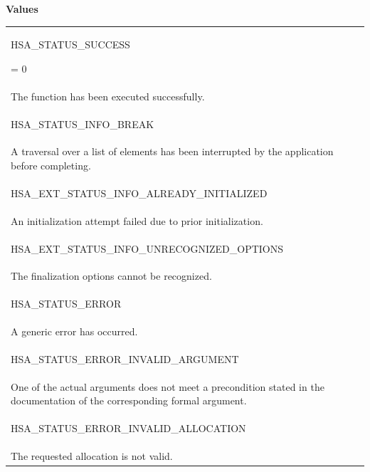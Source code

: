 \documentclass[final]{book}
\newcommand{\reftyp}[1]{#1}
\newcommand{\refenu}[1]{\reftyp{#1}}
\begin{document}
\noindent\textbf{Values}\\[-5mm]
\begin{longtable}{@{\hspace{2em}}p{\linewidth-2em}}
\hspace{-2em}\hypertarget{group__status_1ggad755322e7ff95456520e8abdbe90d225ae382ea0c9c05cce5a60d0317375159cc}{\refenu{HSA_\-STATUS_\-SUCCESS}} = 0\\The function has been executed successfully.\\[2mm]
\hspace{-2em}\hypertarget{group__status_1ggad755322e7ff95456520e8abdbe90d225a86c476121ca787ff75f6a4676507b221}{\refenu{HSA_\-STATUS_\-INFO_\-BREAK}} \\A traversal over a list of elements has been interrupted by the application before completing.\\[2mm]
\hspace{-2em}\hypertarget{group__status_1ggad755322e7ff95456520e8abdbe90d225a0882e3ebb9cc8a5c6033c43ee7a6d898}{\refenu{HSA_\-EXT_\-STATUS_\-INFO_\-ALREADY_\-INITIALIZED}} \\An initialization attempt failed due to prior initialization.\\[2mm]
\hspace{-2em}\hypertarget{group__status_1ggad755322e7ff95456520e8abdbe90d225a60343279bea68766b037297915b5f903}{\refenu{HSA_\-EXT_\-STATUS_\-INFO_\-UNRECOGNIZED_\-OPTIONS}} \\The finalization options cannot be recognized.\\[2mm]
\hspace{-2em}\hypertarget{group__status_1ggad755322e7ff95456520e8abdbe90d225a60edf4d82e4703ff750ea38d619fea88}{\refenu{HSA_\-STATUS_\-ERROR}} \\A generic error has occurred.\\[2mm]
\hspace{-2em}\hypertarget{group__status_1ggad755322e7ff95456520e8abdbe90d225ac7d3651f75107d2a6a8ba3b25683c030}{\refenu{HSA_\-STATUS_\-ERROR_\-INVALID_\-ARGUMENT}} \\One of the actual arguments does not meet a precondition stated in the documentation of the corresponding formal argument.\\[2mm]
\hspace{-2em}\hypertarget{group__status_1ggad755322e7ff95456520e8abdbe90d225ac818189ff640d38ce13558e72daddb75}{\refenu{HSA_\-STATUS_\-ERROR_\-INVALID_\-ALLOCATION}} \\The requested allocation is not valid.\\[2mm]

\end{longtable}
\end{document}
